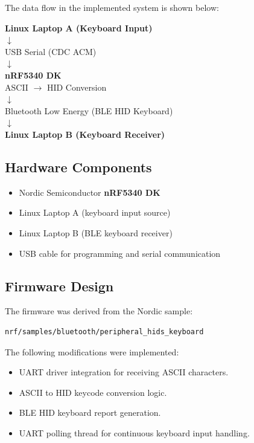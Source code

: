 \documentclass[conference]{IEEEtran}
\begin{document}
The data flow in the implemented system is shown below:

\begin{center}
\textbf{Linux Laptop A (Keyboard Input)}\\
$\downarrow$\\
USB Serial (CDC ACM)\\
$\downarrow$\\
\textbf{nRF5340 DK}\\
ASCII $\rightarrow$ HID Conversion\\
$\downarrow$\\
Bluetooth Low Energy (BLE HID Keyboard)\\
$\downarrow$\\
\textbf{Linux Laptop B (Keyboard Receiver)}
\end{center}

\subsection{Hardware Components}

\begin{itemize}
\item Nordic Semiconductor \textbf{nRF5340 DK}
\item Linux Laptop A (keyboard input source)
\item Linux Laptop B (BLE keyboard receiver)
\item USB cable for programming and serial communication
\end{itemize}

\subsection{Firmware Design}

The firmware was derived from the Nordic sample:

\begin{lstlisting}[language=bash]
nrf/samples/bluetooth/peripheral_hids_keyboard
\end{lstlisting}

The following modifications were implemented:

\begin{itemize}
\item UART driver integration for receiving ASCII characters.
\item ASCII to HID keycode conversion logic.
\item BLE HID keyboard report generation.
\item UART polling thread for continuous keyboard input handling.
\end{itemize}
\end{document}
